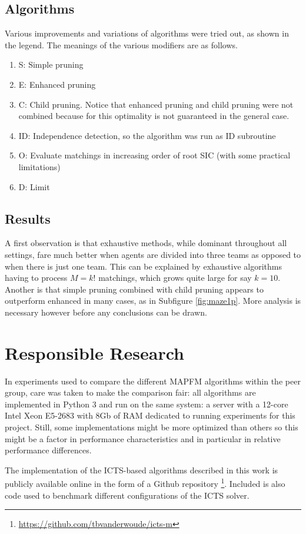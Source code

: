 \documentclass[english]{article}
\begin{document}
	\subsection{Algorithms}
	Various improvements and variations of algorithms were tried out, as shown in the legend. The meanings of the various modifiers are as follows.
	\begin{enumerate}
		\item S: Simple pruning
		\item E: Enhanced pruning
		\item C: Child pruning. Notice that enhanced pruning and child pruning were not combined because for this optimality is not guaranteed in the general case.
		\item ID: Independence detection, so the algorithm was run as ID subroutine
		\item O: Evaluate matchings in increasing order of root SIC (with some practical limitations)
		\item D: Limit 
	\end{enumerate}
	\subsection{Results}
	A first observation is that exhaustive methods, while dominant throughout all settings, fare much better when agents are divided into three teams as opposed to when there is just one team. This can be explained by exhaustive algorithms having to process $M = k!$ matchings, which grows quite large for say $k = 10$. Another is that simple pruning combined with child pruning appears to outperform enhanced in many cases, as in Subfigure \ref{fig:maze1p}. More analysis is necessary however before any conclusions can be drawn.
	
	
	\section{Responsible Research}
	In experiments used to compare the different MAPFM algorithms within the peer group, care was taken to make the comparison fair: all algorithms are implemented in Python 3 and run on the same system: a server with a 12-core Intel Xeon E5-2683 with 8Gb of RAM dedicated to running experiments for this project. Still, some implementations might be more optimized than others so this might be a factor in performance characteristics and in particular in relative performance differences.
	
	The implementation of the ICTS-based algorithms described in this work is publicly available online in the form of a Github repository \footnote{\url{https://github.com/tbvanderwoude/icts-m}}. Included is also code used to benchmark different configurations of the ICTS solver.
	
\end{document}

